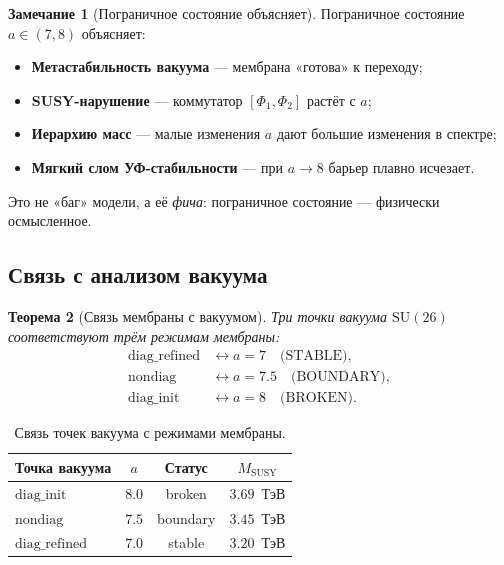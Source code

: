 \documentclass[11pt,a4paper]{article}
\newcommand{\SU}{\ensuremath{\mathrm{SU}}}
\newtheorem{theorem}{Теорема}[section]
\theoremstyle{definition}
\newtheorem{remark}[theorem]{Замечание}
\begin{document}
\begin{remark}[Пограничное состояние объясняет]
\label{rem:membrane-boundary-explains}
Пограничное состояние $a \in (7, 8)$ объясняет:
\begin{itemize}
    \item \textbf{Метастабильность вакуума} --- мембрана
          «готова» к переходу;
    \item \textbf{SUSY-нарушение} --- коммутатор $[\Phi_1, \Phi_2]$
          растёт с $a$;
    \item \textbf{Иерархию масс} --- малые изменения $a$ дают
          большие изменения в спектре;
    \item \textbf{Мягкий слом УФ-стабильности} --- при $a \to 8$
          барьер плавно исчезает.
\end{itemize}
Это не «баг» модели, а её \emph{фича}: пограничное состояние
--- физически осмысленное.
\end{remark}

\subsection{Связь с анализом вакуума}
\label{subsec:membrane-vacuum-link}

\begin{theorem}[Связь мембраны с вакуумом]
\label{thm:membrane-vacuum}
Три точки вакуума $\SU(26)$ соответствуют
трём режимам мембраны:
\begin{equation}
    \boxed{
    \begin{aligned}
        \text{diag\_refined} &\leftrightarrow a = 7 \quad \text{(STABLE)}, \\
        \text{nondiag}       &\leftrightarrow a = 7.5 \quad \text{(BOUNDARY)}, \\
        \text{diag\_init}    &\leftrightarrow a = 8 \quad \text{(BROKEN)}.
    \end{aligned}}
    \label{eq:membrane-vacuum-link}
\end{equation}
\end{theorem}

\begin{table}[ht]
\centering
\caption{Связь точек вакуума с режимами мембраны.}
\label{tab:membrane-vacuum-table}
\begin{tabular}{lccc}
\toprule
Точка вакуума & $a$ & Статус & $M_{\text{SUSY}}$ \\
\midrule
$\text{diag\_init}$    & $8.0$ & broken   & $3.69$~ТэВ \\
$\text{nondiag}$       & $7.5$ & boundary & $3.45$~ТэВ \\
$\text{diag\_refined}$ & $7.0$ & stable   & $3.20$~ТэВ \\
\bottomrule
\end{tabular}
\end{table}
\end{document}
